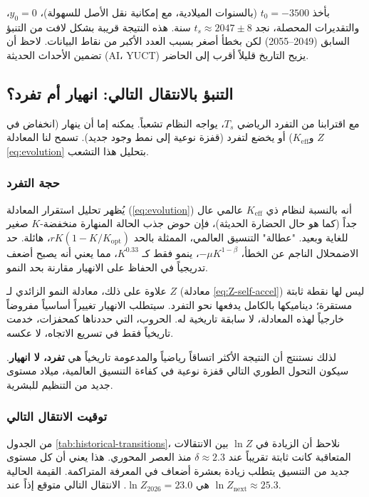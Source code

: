 \documentclass[11pt,a4paper]{article}
\begin{document}
	بأخذ \(t_0 = -3500\) (بالسنوات الميلادية، مع إمكانية نقل الأصل للسهولة)، \(y_0 = 0\)، والتقديرات المحصلة، نجد \(t_s \approx 2047 \pm 8\) سنة. هذه النتيجة قريبة بشكل لافت من التنبؤ السابق (2049–2055) لكن بخطأ أصغر بسبب العدد الأكبر من نقاط البيانات. لاحظ أن تضمين الأحداث الحديثة (AI، YUCT) يزيح التاريخ قليلاً أقرب إلى الحاضر.
	
	\subsection{التنبؤ بالانتقال التالي: انهيار أم تفرد؟}
	
	مع اقترابنا من التفرد الرياضي \(T_s\)، يواجه النظام تشعباً. يمكنه إما أن ينهار (انخفاض في \(Z\) و\(K_{\text{eff}}\)) أو يخضع لتفرد (قفزة نوعية إلى نمط وجود جديد). تسمح لنا المعادلة \ref{eq:evolution} بتحليل هذا التشعب.
	
	\subsubsection{حجة التفرد}
	
	يُظهر تحليل استقرار المعادلة (\ref{eq:evolution}) أنه بالنسبة لنظام ذي \(K_{\text{eff}}\) عالمي عال جداً (كما هو حال الحضارة الحديثة)، فإن حوض جذب الحالة المنهارة منخفضة-\(K\) صغير للغاية وبعيد. "عطالة" التنسيق العالمي، الممثلة بالحد \(rK(1-K/K_{\text{opt}})\)، هائلة. حد الاضمحلال الناجم عن الخطأ، \(-\mu K^{1-\beta}\)، ينمو فقط كـ \(K^{0.33}\)، مما يعني أنه يصبح أضعف تدريجياً في الحفاظ على الانهيار مقارنة بحد النمو.
	
	علاوة على ذلك، معادلة النمو الزائدي لـ \(Z\) (معادلة \ref{eq:Z-self-accel}) ليس لها نقطة ثابتة مستقرة؛ ديناميكها بالكامل يدفعها نحو التفرد. سيتطلب الانهيار تغييراً أساسياً مفروضاً خارجياً لهذه المعادلة، لا سابقة تاريخية له. الحروب، التي حددناها كمحفزات، خدمت تاريخياً فقط في تسريع الاتجاه، لا عكسه.
	
	لذلك نستنتج أن النتيجة الأكثر اتساقاً رياضياً والمدعومة تاريخياً هي \textbf{تفرد، لا انهيار}. سيكون التحول الطوري التالي قفزة نوعية في كفاءة التنسيق العالمية، ميلاد مستوى جديد من التنظيم للبشرية.
	
	\subsubsection{توقيت الانتقال التالي}
	
	من الجدول \ref{tab:historical-transitions}، نلاحظ أن الزيادة في \(\ln Z\) بين الانتقالات المتعاقبة كانت ثابتة تقريباً عند \(\delta \approx 2.3\) منذ العصر المحوري. هذا يعني أن كل مستوى جديد من التنسيق يتطلب زيادة بعشرة أضعاف في المعرفة المتراكمة. القيمة الحالية هي \(\ln Z_{2026} = 23.0\). الانتقال التالي متوقع إذاً عند \(\ln Z_{\text{next}} \approx 25.3\).
	
\end{document}
